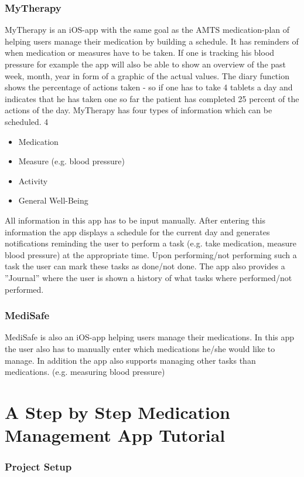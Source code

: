 \documentclass{article}
\begin{document}
\section{MyTherapy}
MyTherapy\citep{06-mytherapy} is an iOS-app with the same goal as the AMTS medication-plan of helping users manage their medication by building a schedule. It has reminders of when medication or measures have to be taken. If one is tracking his blood pressure for example the app will also be able to show an overview of the past week, month, year in form of a graphic of the actual values. The diary function shows the percentage of actions taken - so if one has to take 4 tablets a day and indicates that he has taken one so far the patient has completed 25 percent of the actions of the day.
MyTherapy has four types of information which can be scheduled. 4
\begin{itemize}
  \item
    Medication
  \item
    Measure (e.g. blood pressure)
  \item
    Activity
  \item
    General Well-Being
\end{itemize}
All information in this app has to be input manually. After entering this information the app displays a schedule for the current day and generates notifications reminding the user to perform a task (e.g. take medication, measure blood pressure) at the appropriate time. Upon performing/not performing such a task the user can mark these tasks as done/not done. The app also provides a ”Journal” where the user is shown a history of what tasks where performed/not performed.

\section{MediSafe}

MediSafe\citep{07-medisafe} is also an iOS-app helping users manage their medications. In this app the user also has to manually enter which medications he/she would like to manage. In addition the app also supports managing other tasks than medications. (e.g. measuring blood pressure)


\part{A Step by Step Medication Management App Tutorial}
\section{Project Setup}\label{step1}
\end{document}
